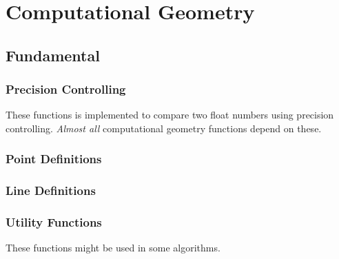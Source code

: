 \chapter{Computational Geometry}


\section{Fundamental}

\subsection{Precision Controlling}
\label{cgeom:precision}

These functions is implemented to compare two float numbers using precision
controlling. \emph{Almost all} computational geometry functions depend on
these.





\subsection{Point Definitions}
\label{cgeom:pointdef}



\subsection{Line Definitions}




\subsection{Utility Functions}
\label{cgeom:utility}

These functions might be used in some algorithms.



